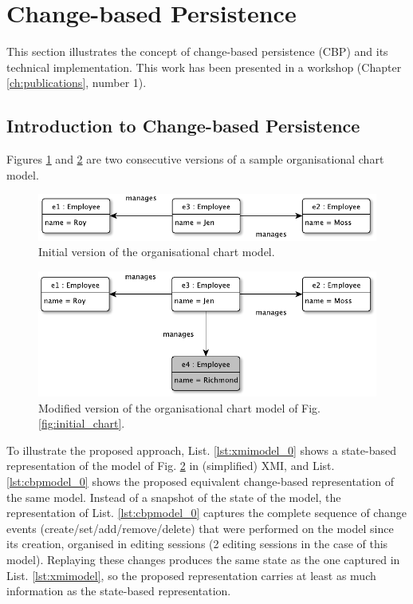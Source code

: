 \documentclass[12pt, a4paper]{report} \usepackage[titletoc]{appendix}
\begin{document}
\section{Change-based Persistence}
\label{sec:change-based_persistence}
This section illustrates the concept of change-based persistence (CBP) and its technical implementation. This work has been presented in a workshop (Chapter \ref{ch:publications}, number 1). 

\subsection{Introduction to Change-based Persistence}
\label{subsec:introduction_to_change-based_persistence}
Figures \ref{fig:initial_chart_0} and \ref{fig:modified_chart} are two consecutive versions of a sample organisational chart model. 

\begin{figure}[ht]
	\centering
	\includegraphics[width=\linewidth]{initial_chart_0}
	\caption{Initial version of the organisational chart model.}
	\label{fig:initial_chart_0}
\end{figure}

\begin{figure}[ht]
	\centering
	\includegraphics[width=\linewidth]{modified_chart}
	\caption{Modified version of the organisational chart model of Fig. \ref{fig:initial_chart}.}
	\label{fig:modified_chart}
\end{figure}

To illustrate the proposed approach, List. \ref{lst:xmimodel_0} shows a state-based representation of the model of Fig. \ref{fig:modified_chart} in (simplified) XMI, and List. \ref{lst:cbpmodel_0} shows the proposed equivalent change-based representation of the same model. Instead of a snapshot of the state of the model, the representation of List. \ref{lst:cbpmodel_0} captures the complete sequence of change events (create/set/add/remove/delete) that were performed on the model since its creation, organised in editing sessions (2 editing sessions in the case of this model). Replaying these changes produces the same state as the one captured in List. \ref{lst:xmimodel}, so the proposed representation carries at least as much information as the state-based representation.
\end{document}
